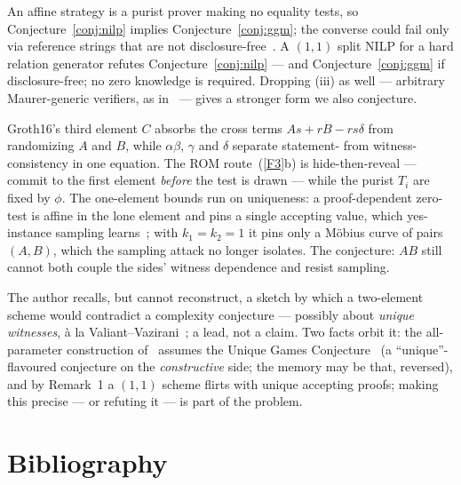 \documentclass{aicr-conjecture}
\begin{document}
\noindent
An affine strategy is a purist prover making no equality tests, so
Conjecture~\ref{conj:nilp} implies Conjecture~\ref{conj:ggm}; the
converse could fail only via reference strings that are not
disclosure-free~\cite[Def.~4, Lemma~1]{Gro16}.  A $(1,1)$ split
NILP for a hard relation generator refutes
Conjecture~\ref{conj:nilp} --- and Conjecture~\ref{conj:ggm} if
disclosure-free; no zero knowledge is required.  Dropping (iii) as
well --- arbitrary Maurer-generic verifiers, as in~\cite{ADY25} ---
gives a stronger form we also conjecture.

\begin{remark}
Groth16's third element $C$ absorbs the cross terms
$As + rB - rs\delta$ from randomizing $A$ and $B$, while
$\alpha\beta$, $\gamma$ and $\delta$ separate statement- from
witness-consistency in one equation.  The ROM
route~\textup{(\ref{F3}b)} is hide-then-reveal --- commit to the
first element \emph{before} the test is drawn --- while the purist
$T_i$ are fixed by $\phi$.  The one-element bounds run on
uniqueness: a proof-dependent zero-test is affine in the lone
element and pins a single accepting value, which yes-instance
sampling learns~\cite{Gro16,ADY25}; with $k_1 = k_2 = 1$ it pins
only a M\"obius curve of pairs $(A,B)$, which the sampling attack no
longer isolates.  The conjecture: $AB$ still cannot both couple the
sides' witness dependence and resist sampling.
\end{remark}

\begin{remark}
The author recalls, but cannot reconstruct, a sketch by which a
two-element scheme would contradict a complexity conjecture ---
possibly about \emph{unique witnesses}, \`a la
Valiant--Vazirani~\cite{VV86}; a lead, not a claim.  Two facts orbit
it: the all-parameter construction of~\cite{ADY25} assumes the
Unique Games Conjecture~\cite{Kho02} (a ``unique''-flavoured
conjecture on the \emph{constructive} side; the memory may be that,
reversed), and by Remark~1 a $(1,1)$ scheme flirts with unique
accepting proofs; making this precise --- or refuting it --- is part
of the problem.
\end{remark}

\section{Bibliography}
\end{document}
